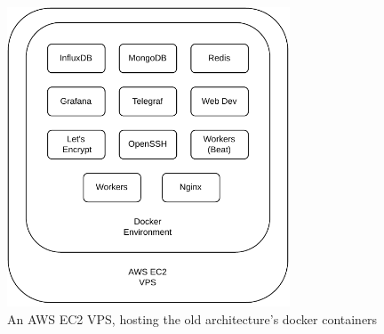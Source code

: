 \begin{figure}[!htbp]
    \centering
    \includegraphics[width=0.75\textwidth]{img/diagrams/pdf/old-arch.drawio.pdf}
    \caption[AWS EC2 VPS Overview]{An AWS EC2 VPS, hosting the old architecture's docker containers}
    \label{fig:old-arch.drawio.pdf}
\end{figure}
    